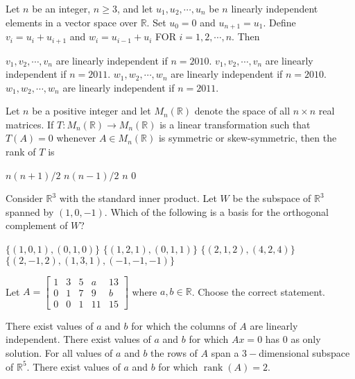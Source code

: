 \documentclass[10pt]{exam}
\DeclareMathOperator{\rank}{\text{rank}}
\newcommand{\R}{\ensuremath{\mathbb{R}}}
\begin{document}
\begin{questions}
\question
Let $n$ be an  integer, $n\geq 3$, and let $u_1,u_2,\cdots,u_n$ be $n$ linearly independent elements in a vector space over $\R$. Set $u_0=0$ and $u_{n+1}=u_1$. Define $v_i=u_i+u_{i+1}$ and $w_i=u_{i-1}+u_{i}$ FOR $i=1,2,\cdots, n$. Then

\begin{choices}
\choice $v_1,v_2,\cdots,v_n$  are linearly independent if $n=2010$.
\choice $v_1,v_2,\cdots,v_n$  are linearly independent if $n=2011$.
\choice $w_1,w_2,\cdots,w_n$  are linearly independent if $n=2010$.
\choice $w_1,w_2,\cdots,w_n$  are linearly independent if $n=2011$.
\end{choices}



\question
Let $n$ be a positive integer and let $M_n(\R)$ denote the space of all $n\times n$ real matrices. If $T:M_n(\R)\rightarrow M_n(\R)$
is a linear transformation such that $T(A)=0$ whenever $A \in M_n(\R)$ is symmetric or skew-symmetric, then the rank of $T$ is

\begin{oneparchoices}
\choice $n(n+1)/2$              
\choice $n(n-1)/2$ 
\choice $n$ 
\choice $0$
\end{oneparchoices}

\question
Consider $\R^3$ with the standard inner product. Let $W$ be the subspace of $\R^3$ spanned by $(1,0,-1)$. Which of the following is a
basis for the orthogonal complement of $W$?

\begin{choices}
\choice $\{(1,0,1),(0,1,0)\}$
\choice $\{(1,2,1),(0,1,1)\}$
\choice $\{(2,1,2),(4,2,4)\}$
\choice $\{(2,-1,2),(1,3,1),(-1,-1,-1)\}$
\end{choices}


\question
Let $A=\begin{bmatrix}
1 & 3 & 5 & a & 13 \\ 
0 & 1 & 7 & 9 & b \\ 
0 & 0 & 1 & 11 & 15
\end{bmatrix} $ where $a,b \in \R$. Choose the correct statement.

\begin{choices}
\choice There exist values of $a$ and $b$ for which the columns of $A$ are linearly independent.
\choice There exist values of $a$ and $b$ for which $Ax=0$ has $0$ as only solution.
\choice For all values of $a$ and $b$ the rows of $A$ span a $3-$dimensional subspace of $\R^5$.
\choice There exist values of $a$ and $b$ for which $\rank(A)=2$.
\end{choices}



\end{questions}
\end{document}

